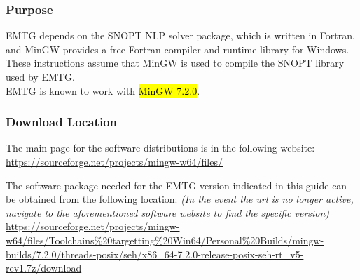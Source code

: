 
\subsubsection{Purpose}
\noindent \ac{EMTG} depends on the \ac{SNOPT} \ac{NLP} solver package, which is written in Fortran, and MinGW provides a free Fortran compiler and runtime library for Windows. These instructions assume that MinGW is used to compile the \ac{SNOPT} library used by \ac{EMTG}. \\ \ac{EMTG} is known to work with \hl{MinGW 7.2.0}.

\subsubsection{Download Location}
\noindent The main page for the software distributions is in the following website: \\
\url{https://sourceforge.net/projects/mingw-w64/files/}

\noindent The software package needed for the EMTG version indicated in this guide can be obtained from the following location:
\emph{(In the event the url is no longer active, navigate to the aforementioned software website to find the specific version)} \\ \url{https://sourceforge.net/projects/mingw-w64/files/Toolchains%20targetting%20Win64/Personal%20Builds/mingw-builds/7.2.0/threads-posix/seh/x86_64-7.2.0-release-posix-seh-rt_v5-rev1.7z/download}

